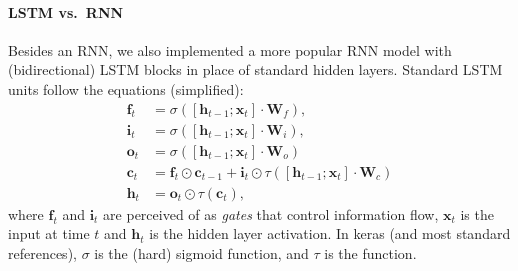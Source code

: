 
\paragraph{LSTM vs.\ RNN} Besides an RNN, we also implemented a more popular RNN model with (bidirectional) LSTM blocks in place of standard hidden layers. Standard LSTM units follow the equations (simplified):
\begin{align*}
  \mathbf{f}_t &= \sigma([\mathbf{h}_{t-1};\mathbf{x}_t]\cdot \mathbf{W}_f),\\
  \mathbf{i}_t &= \sigma([\mathbf{h}_{t-1};\mathbf{x}_t]\cdot \mathbf{W}_i),\\
  \mathbf{o}_t &= \sigma([\mathbf{h}_{t-1};\mathbf{x}_t]\cdot \mathbf{W}_o)\\
  \mathbf{c}_t &= \mathbf{f}_t\odot \mathbf{c}_{t-1}+\mathbf{i}_t\odot\tau([\mathbf{h}_{t-1};\mathbf{x}_t]\cdot \mathbf{W}_c)\\
  \mathbf{h}_t &= \mathbf{o}_t\odot \tau(\mathbf{c}_t),
\end{align*}
where $\mathbf{f}_t$ and $\mathbf{i}_t$ are perceived of as \emph{gates} that control information flow,
$\mathbf{x}_t$ is the input at time $t$ and $\mathbf{h}_t$ is the hidden layer activation. In keras (and most standard references), $\sigma$ is the (hard) sigmoid function, and $\tau$ is the \mytanh{} function. 


